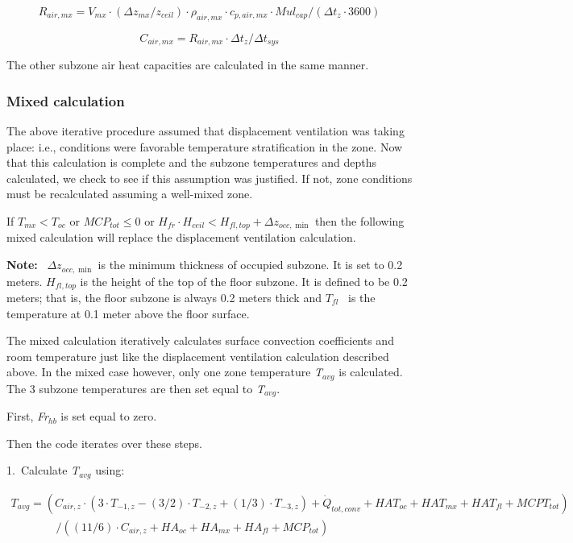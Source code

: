 {\begin{equation}
{R_{air,mx}} = {V_{mx}} \cdot (\Delta {z_{mx}}/{z_{ceil}}) \cdot {\rho_{air,mx}} \cdot {c_{p,air,mx}} \cdot Mu{l_{cap}}/(\Delta {t_z} \cdot 3600)
\end{equation}

\begin{equation}
{C_{air,mx}} = {R_{air,mx}} \cdot \Delta {t_z}/\Delta {t_{sys}}
\end{equation}

The other subzone air heat capacities are calculated in the same manner.

\subsubsection{Mixed calculation}\label{mixed-calculation}

The above iterative procedure assumed that displacement ventilation was taking place: i.e., conditions were favorable temperature stratification in the zone. Now that this calculation is complete and the subzone temperatures and depths calculated, we check to see if this assumption was justified. If not, zone conditions must be recalculated assuming a well-mixed zone.

If \({T_{mx}} < {T_{oc}}\) or \(MC{P_{tot}} \le 0\) or \({H_{fr}} \cdot {H_{ceil}} < {H_{fl,top}} + \Delta {z_{occ,\min }}\) then the following mixed calculation will replace the displacement ventilation calculation.

\textbf{Note:} ~\(\Delta {z_{occ,\min }}\) is the minimum thickness of occupied subzone. It is set to 0.2 meters. \({H_{fl,top}}\) is the height of the top of the floor subzone. It is defined to be 0.2 meters; that is, the floor subzone is always 0.2 meters thick and \({T_{fl}}\) ~is the temperature at 0.1 meter above the floor surface.

The mixed calculation iteratively calculates surface convection coefficients and room temperature just like the displacement ventilation calculation described above. In the mixed case however, only one zone temperature \emph{T\(_{avg}\)} is calculated. The 3 subzone temperatures are then set equal to \emph{T\(_{avg}\)}.

First, \emph{Fr\(_{hb}\)} is set equal to zero.

Then the code iterates over these steps.

1.~Calculate \emph{T\(_{avg}\)} using:

{\scriptsize
\begin{equation}
\begin{array}{l}
T_{avg} = (C_{air,z} \cdot (3 \cdot T_{ - 1,z} - (3/2) \cdot T_{ - 2,z} + (1/3) \cdot T_{ - 3,z}) + \dot Q_{tot,conv} + HAT_{oc} + HAT_{mx} + HAT_{fl} + MCPT_{tot}) \\
\quad \quad \quad \quad / ((11/6) \cdot C_{air,z} + HA_{oc} + HA_{mx} + HA_{fl} + MCP_{tot})
\end{array}
\end{equation}}

}
